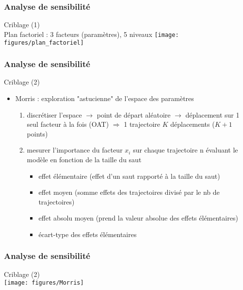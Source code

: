 \documentclass[10pt]{beamer}
\begin{document}
\begin{frame}
\frametitle{Analyse de sensibilité}

\bigskip


Criblage (1)
\bigskip
\\
Plan factoriel : 3 facteurs (paramètres), 5 niveaux
\centering
\texttt{[image: figures/plan\_factoriel]}


\end{frame}

\begin{frame}
\frametitle{Analyse de sensibilité}

\bigskip
\bigskip

Criblage (2)
\bigskip

\begin{itemize}
	\item Morris : exploration "astucienne" de l'espace des paramètres
	\begin{enumerate}	
		\item discrétiser l'espace $ \rightarrow $ point de départ aléatoire $ \rightarrow $ déplacement sur 1 seul facteur à la fois (OAT) $ \Rightarrow $ 1 trajectoire $ K $ déplacements ($ K+1 $ points)
		\item mesurer l'importance du facteur $ x_{i} $ sur chaque trajectoire n évaluant le modèle en fonction de la taille du saut
		\begin{itemize}
			\item effet élémentaire (effet d'un saut rapporté à la taille du saut)
			\item effet moyen (somme effets des trajectoires divisé par le nb de trajectoires)
			\item effet absolu moyen (prend la valeur absolue des effets élémentaires)
			\item écart-type des effets élémentaires
		\end{itemize}
	\end{enumerate}
\end{itemize}

\end{frame}

\begin{frame}
\frametitle{Analyse de sensibilité}

\bigskip
\bigskip

Criblage (2)
\bigskip
\\

\centering
\texttt{[image: figures/Morris]}

\end{frame}
\end{document}
